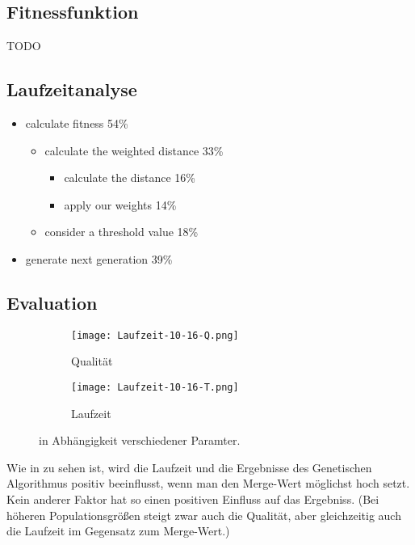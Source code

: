 \subsection{Fitnessfunktion}
TODO

\subsection[Laufzeitanalyse]{Laufzeitanalyse\protect\footnotemark}
\begin{itemize}
  \item calculate fitness 54\%
  \begin{itemize}
    \item calculate the weighted distance 33\%
    \begin{itemize}
      \item calculate the distance 16\%
      \item apply our weights 14\%
    \end{itemize}
    \item consider a threshold value 18\%
  \end{itemize}
  \item generate next generation 39\%
\end{itemize}

\subsection[Evaluation]{Evaluation\protect\footnotemark}
\label{sec:Evaluation_genAlg}

\begin{figure}
  \begin{subfigure}{\textwidth}
  \texttt{[image: Laufzeit-10-16-Q.png]}
  \caption{Qualität}
  \end{subfigure}

  \begin{subfigure}{\textwidth}
  \texttt{[image: Laufzeit-10-16-T.png]}
  \caption{Laufzeit}
  \end{subfigure}
\caption{in Abhängigkeit verschiedener Paramter.}
\label{fig:GenAlgAll}
\end{figure}

Wie in  zu sehen ist, wird die Laufzeit und die Ergebnisse des Genetischen Algorithmus positiv beeinflusst,
wenn man den Merge-Wert möglichst hoch setzt. Kein anderer Faktor hat so einen positiven Einfluss auf das Ergebniss.
(Bei höheren Populationsgrößen steigt zwar auch die Qualität, aber gleichzeitig auch die Laufzeit im Gegensatz zum Merge-Wert.)

